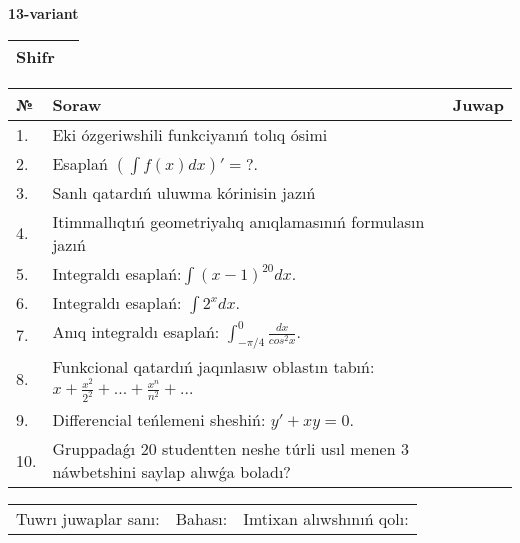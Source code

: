 \documentclass{article}
\begin{document}
  \egroup
  
  \newpage
  
  
  \textbf{13-variant}\\
  
  \bgroup
  \def\arraystretch{1.6} %
  
  \begin{tabular}{|m{5.7cm}|m{9.5cm}|}
  \hline
  Shifr & \\
  \hline
  \end{tabular}
  
  \vspace{1cm}
  
  \begin{tabular}{|m{0.7cm}|m{10cm}|m{4cm}|}
  \hline
  № & Soraw & Juwap \\
  \hline
  1. & Eki ózgeriwshili funkciyanıń tolıq ósimi &  \\
  \hline
  2. & Esaplań \(\left( \int{f(x)dx} \right)' = ?\). &  \\
  \hline
  3. & Sanlı qatardıń uluwma kórinisin jazıń &  \\
  \hline
  4. & Itimmallıqtıń geometriyalıq anıqlamasınıń formulasın jazıń &  \\
  \hline
  5. & Integraldı esaplań:\(\int{(x - 1)^{20}}dx\). &  \\
  \hline
  6. & Integraldı esaplań: \(\int{2^{x}dx}\). &  \\
  \hline
  7. & Anıq integraldı esaplań: \(\int_{- \pi/4}^{0}\frac{dx}{cos^2 x}\). &  \\
  \hline
  8. & Funkcional qatardıń jaqınlasıw oblastın tabıń: \(x + \frac{x^2 }{2^2 } + ... + \frac{x^{n}}{n^2 } + ...\) &  \\
  \hline
  9. & Differencial teńlemeni sheshiń: \(y' + xy = 0\). &  \\
  \hline
  10. & Gruppadaǵı 20 studentten neshe túrli usıl menen 3 náwbetshini saylap alıwǵa boladı? &  \\
  \hline
  \end{tabular}
  
  \vspace{1cm}
  
  \begin{tabular}{lll}
  Tuwrı juwaplar sanı: \underline{\hspace{1.5cm}} & 
  Bahası: \underline{\hspace{1.5cm}} & 
  Imtixan alıwshınıń qolı: \underline{\hspace{2cm}} \\
  \end{tabular}
  
\end{document}
